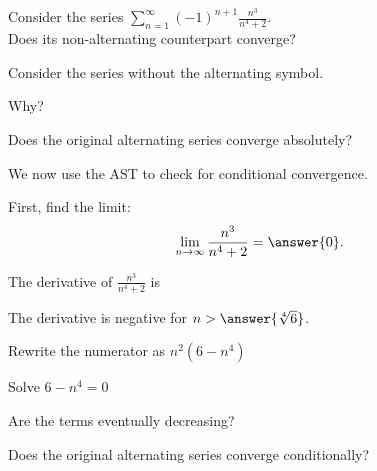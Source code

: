 \documentclass{ximera}
\begin{document}
\begin{problem}
Consider the series $\displaystyle{\sum_{n=1}^\infty (-1)^{n+1} \frac{n^3}{n^4 + 2}}$.\\
Does its non-alternating counterpart converge?
\begin{hint} 
Consider the series without the alternating symbol.
\end{hint}
\begin{multipleChoice}
\end{multipleChoice}

Why?
\begin{multipleChoice}
\end{multipleChoice}




Does the original alternating series converge absolutely?
\begin{multipleChoice}
\end{multipleChoice}

We now use the AST to check for conditional convergence.

First, find the limit:
\[
\lim_{n\to\infty} \frac{n^3}{n^4 + 2} = \answer{0}.
\]

The derivative of $\displaystyle{\frac{n^3}{n^4 + 2}}$ is  

\begin{multipleChoice}
\end{multipleChoice}


The derivative is negative for $n > \answer{\sqrt[4]6}$.
\begin{hint}
Rewrite the numerator as $n^2(6-n^4)$
\end{hint}
\begin{hint}
Solve $6 - n^4 = 0$
\end{hint}

Are the terms eventually decreasing?
\begin{multipleChoice}
\end{multipleChoice}


Does the original alternating series converge conditionally?
\begin{multipleChoice}
\end{multipleChoice}


\end{problem}
\end{document}
